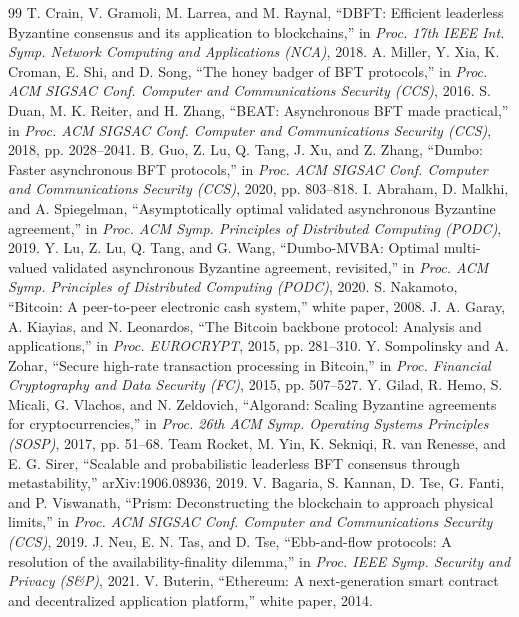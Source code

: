\documentclass[UTF8,fontset=windows,a4paper,11pt]{ctexart}
\begin{document}
\begin{thebibliography}{99}
 T. Crain, V. Gramoli, M. Larrea, and M. Raynal, “DBFT: Efficient leaderless Byzantine consensus and its application to blockchains,” in \textit{Proc. 17th IEEE Int. Symp. Network Computing and Applications (NCA)}, 2018.
 A. Miller, Y. Xia, K. Croman, E. Shi, and D. Song, “The honey badger of BFT protocols,” in \textit{Proc. ACM SIGSAC Conf. Computer and Communications Security (CCS)}, 2016.
 S. Duan, M. K. Reiter, and H. Zhang, “BEAT: Asynchronous BFT made practical,” in \textit{Proc. ACM SIGSAC Conf. Computer and Communications Security (CCS)}, 2018, pp. 2028–2041.
 B. Guo, Z. Lu, Q. Tang, J. Xu, and Z. Zhang, “Dumbo: Faster asynchronous BFT protocols,” in \textit{Proc. ACM SIGSAC Conf. Computer and Communications Security (CCS)}, 2020, pp. 803–818.
 I. Abraham, D. Malkhi, and A. Spiegelman, “Asymptotically optimal validated asynchronous Byzantine agreement,” in \textit{Proc. ACM Symp. Principles of Distributed Computing (PODC)}, 2019.
 Y. Lu, Z. Lu, Q. Tang, and G. Wang, “Dumbo-MVBA: Optimal multi-valued validated asynchronous Byzantine agreement, revisited,” in \textit{Proc. ACM Symp. Principles of Distributed Computing (PODC)}, 2020.
 S. Nakamoto, “Bitcoin: A peer-to-peer electronic cash system,” white paper, 2008.
 J. A. Garay, A. Kiayias, and N. Leonardos, “The Bitcoin backbone protocol: Analysis and applications,” in \textit{Proc. EUROCRYPT}, 2015, pp. 281–310.
 Y. Sompolinsky and A. Zohar, “Secure high-rate transaction processing in Bitcoin,” in \textit{Proc. Financial Cryptography and Data Security (FC)}, 2015, pp. 507–527.
 Y. Gilad, R. Hemo, S. Micali, G. Vlachos, and N. Zeldovich, “Algorand: Scaling Byzantine agreements for cryptocurrencies,” in \textit{Proc. 26th ACM Symp. Operating Systems Principles (SOSP)}, 2017, pp. 51–68.
 Team Rocket, M. Yin, K. Sekniqi, R. van Renesse, and E. G. Sirer, “Scalable and probabilistic leaderless BFT consensus through metastability,” arXiv:1906.08936, 2019.
 V. Bagaria, S. Kannan, D. Tse, G. Fanti, and P. Viswanath, “Prism: Deconstructing the blockchain to approach physical limits,” in \textit{Proc. ACM SIGSAC Conf. Computer and Communications Security (CCS)}, 2019.
 J. Neu, E. N. Tas, and D. Tse, “Ebb-and-flow protocols: A resolution of the availability-finality dilemma,” in \textit{Proc. IEEE Symp. Security and Privacy (S\&P)}, 2021.
 V. Buterin, “Ethereum: A next-generation smart contract and decentralized application platform,” white paper, 2014.

\end{thebibliography}
\end{document}
